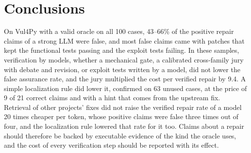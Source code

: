 \documentclass[ai,article,submit,oneauthor]{Definitions/mdpi}
\begin{document}
\section{Conclusions}\label{sec:conclusions}

On Vul4Py with a valid oracle on all 100 cases, 43--66\% of the positive repair claims of a strong LLM were false, and most false claims came with patches that kept the functional tests passing and the exploit tests failing. In these samples, verification by models, whether a mechanical gate, a calibrated cross-family jury with debate and revision, or exploit tests written by a model, did not lower the false assurance rate, and the jury multiplied the cost per verified repair by 9.4. A simple localization rule did lower it, confirmed on 63 unused cases, at the price of 9 of 21 correct claims and with a hint that comes from the upstream fix. Retrieval of other projects' fixes did not raise the verified repair rate of a model 20 times cheaper per token, whose positive claims were false three times out of four, and the localization rule lowered that rate for it too. Claims about a repair should therefore be backed by executable evidence of the kind the oracle uses, and the cost of every verification step should be reported with its effect.

\vspace{6pt}





\end{document}
